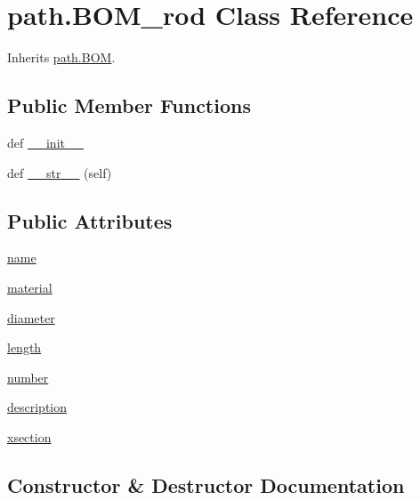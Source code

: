 \hypertarget{classpath_1_1_b_o_m__rod}{}\section{path.\+B\+O\+M\+\_\+rod Class Reference}
\label{classpath_1_1_b_o_m__rod}


Inherits \hyperlink{classpath_1_1_b_o_m}{path.\+B\+O\+M}.

\subsection*{Public Member Functions}
\begin{DoxyCompactItemize}
\item 
def \hyperlink{classpath_1_1_b_o_m__rod_ae21da7cc9eff8544c9fe85a91000055e}{\+\_\+\+\_\+init\+\_\+\+\_\+}
\item 
def \hyperlink{classpath_1_1_b_o_m__rod_aebf04020c123e8686f55a29b62d8bb40}{\+\_\+\+\_\+str\+\_\+\+\_\+} (self)
\end{DoxyCompactItemize}
\subsection*{Public Attributes}
\begin{DoxyCompactItemize}
\item 
\hyperlink{classpath_1_1_b_o_m__rod_af1cca0cffc8952f73eaa38717dd4cc9a}{name}
\item 
\hyperlink{classpath_1_1_b_o_m__rod_a66c6cba2b9e49c6370aeec044a5a427a}{material}
\item 
\hyperlink{classpath_1_1_b_o_m__rod_ad198f4a2306a543354efce3a2d978e6e}{diameter}
\item 
\hyperlink{classpath_1_1_b_o_m__rod_a14a8ad7c48077b0462de5d59d07ee6bb}{length}
\item 
\hyperlink{classpath_1_1_b_o_m__rod_a124a767902802b820af251b6c2c29af7}{number}
\item 
\hyperlink{classpath_1_1_b_o_m__rod_ae26c0d4eb574f858a95536f62e3e8305}{description}
\item 
\hyperlink{classpath_1_1_b_o_m__rod_ae8c232ca908c3b7d6a313c96cb158d48}{xsection}
\end{DoxyCompactItemize}


\subsection{Constructor \& Destructor Documentation}
\hypertarget{classpath_1_1_b_o_m__rod_ae21da7cc9eff8544c9fe85a91000055e}{}
